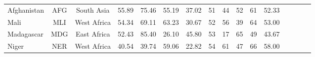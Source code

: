 \begin{singlespace}
{\begin{longtable}[H]{lccccccccccccccc}
Afghanistan                       & AFG           & South Asia         & 55.89       & 75.46            & 55.19                     & 37.02           & 51             & 44                  & 52                           & 61                 & 52.33                  \\
Mali                              & MLI           & West Africa        & 54.34       & 69.11            & 63.23                     & 30.67           & 52             & 56                  & 39                           & 64                 & 53.00                  \\
Madagascar                        & MDG           & East Africa        & 52.43       & 85.40            & 26.10                     & 45.80           & 53             & 17                  & 65                           & 49                 & 43.67                  \\
Niger                             & NER           & West Africa        & 40.54       & 39.74            & 59.06                     & 22.82           & 54             & 61                  & 47                           & 66                 & 58.00                 \\
\hline \hline
\end{longtable}
}
\endgroup
\end{singlespace}
\normalsize

